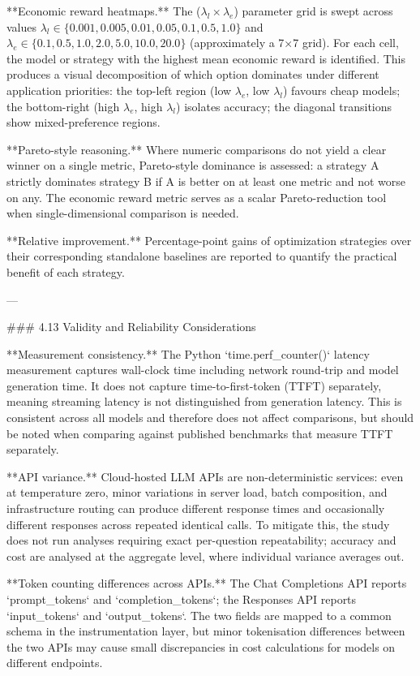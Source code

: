 **Economic reward heatmaps.** The ($\lambda_l \times \lambda_e$) parameter grid is swept across values $\lambda_l \in \{0.001, 0.005, 0.01, 0.05, 0.1, 0.5, 1.0\}$ and $\lambda_e \in \{0.1, 0.5, 1.0, 2.0, 5.0, 10.0, 20.0\}$ (approximately a 7×7 grid). For each cell, the model or strategy with the highest mean economic reward is identified. This produces a visual decomposition of which option dominates under different application priorities: the top-left region (low $\lambda_e$, low $\lambda_l$) favours cheap models; the bottom-right (high $\lambda_e$, high $\lambda_l$) isolates accuracy; the diagonal transitions show mixed-preference regions.

**Pareto-style reasoning.** Where numeric comparisons do not yield a clear winner on a single metric, Pareto-style dominance is assessed: a strategy A strictly dominates strategy B if A is better on at least one metric and not worse on any. The economic reward metric serves as a scalar Pareto-reduction tool when single-dimensional comparison is needed.

**Relative improvement.** Percentage-point gains of optimization strategies over their corresponding standalone baselines are reported to quantify the practical benefit of each strategy.

---

### 4.13 Validity and Reliability Considerations

**Measurement consistency.** The Python `time.perf_counter()` latency measurement captures wall-clock time including network round-trip and model generation time. It does not capture time-to-first-token (TTFT) separately, meaning streaming latency is not distinguished from generation latency. This is consistent across all models and therefore does not affect comparisons, but should be noted when comparing against published benchmarks that measure TTFT separately.

**API variance.** Cloud-hosted LLM APIs are non-deterministic services: even at temperature zero, minor variations in server load, batch composition, and infrastructure routing can produce different response times and occasionally different responses across repeated identical calls. To mitigate this, the study does not run analyses requiring exact per-question repeatability; accuracy and cost are analysed at the aggregate level, where individual variance averages out.

**Token counting differences across APIs.** The Chat Completions API reports `prompt_tokens` and `completion_tokens`; the Responses API reports `input_tokens` and `output_tokens`. The two fields are mapped to a common schema in the instrumentation layer, but minor tokenisation differences between the two APIs may cause small discrepancies in cost calculations for models on different endpoints.

